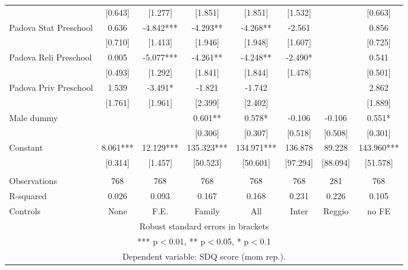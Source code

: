 \begin{tabular}{lccccccc}
 & [0.643] & [1.277] & [1.851] & [1.851] & [1.532] &  & [0.663] \\
Padova Stat Preschool & 0.636 & -4.842*** & -4.293** & -4.268** & -2.561 &  & 0.856 \\
 & [0.710] & [1.413] & [1.946] & [1.948] & [1.607] &  & [0.725] \\
Padova Reli Preschool & 0.005 & -5.077*** & -4.261** & -4.248** & -2.490* &  & 0.541 \\
 & [0.493] & [1.292] & [1.841] & [1.844] & [1.478] &  & [0.501] \\
Padova Priv Preschool & 1.539 & -3.491* & -1.821 & -1.742 &  &  & 2.862 \\
 & [1.761] & [1.961] & [2.399] & [2.402] &  &  & [1.889] \\
Male dummy &  &  & 0.601** & 0.578* & -0.106 & -0.106 & 0.551* \\
 &  &  & [0.306] & [0.307] & [0.518] & [0.508] & [0.301] \\
Constant & 8.061*** & 12.129*** & 135.323*** & 134.971*** & 136.878 & 89.228 & 143.960*** \\
 & [0.314] & [1.457] & [50.523] & [50.601] & [97.294] & [88.094] & [51.578] \\
 &  &  &  &  &  &  &  \\
Observations & 768 & 768 & 768 & 768 & 768 & 281 & 768 \\
R-squared & 0.026 & 0.093 & 0.167 & 0.168 & 0.231 & 0.226 & 0.105 \\
 Controls & None & F.E. & Family & All & Inter & Reggio & no FE \\ \hline
\multicolumn{8}{c}{ Robust standard errors in brackets} \\
\multicolumn{8}{c}{ *** p$<$0.01, ** p$<$0.05, * p$<$0.1} \\
\multicolumn{8}{c}{ Dependent variable: SDQ score (mom rep.).} \\
\end{tabular}
